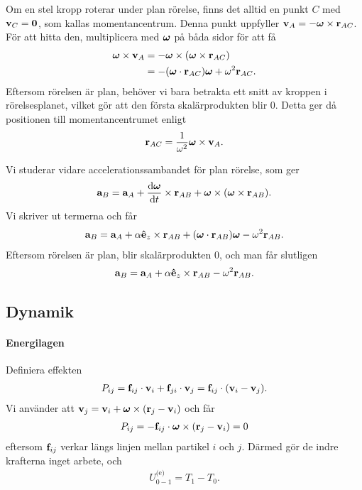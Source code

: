 Om en stel kropp roterar under plan rörelse, finns det alltid en punkt $C$ med $\vb{v}_{C} = \vb{0}$, som kallas momentancentrum. Denna punkt uppfyller $\vb{v}_{A} = -\vb*{\omega}\times\vb{r}_{AC}$. För att hitta den, multiplicera med $\vb*{\omega}$ på båda sidor för att få
\begin{align*}
	\vb*{\omega}\times\vb{v}_{A} &= -\vb*{\omega}\times(\vb*{\omega}\times\vb{r}_{AC}) \\
	                             &= -(\vb*{\omega}\cdot\vb{r}_{AC})\vb*{\omega} + \omega^2\vb{r}_{AC}.
\end{align*}
Eftersom rörelsen är plan, behöver vi bara betrakta ett snitt av kroppen i rörelsesplanet, vilket gör att den första skalärprodukten blir $0$. Detta ger då positionen till momentancentrumet enligt
\begin{align*}
	\vb{r}_{AC} = \frac{1}{\omega^2}\vb*{\omega}\times\vb{v}_{A}.
\end{align*}

Vi studerar vidare accelerationssambandet för plan rörelse, som ger
\begin{align*}
	\vb{a}_{B} = \vb{a}_{A} + \dv{\vb*{\omega}}{t}\times\vb{r}_{AB} + \vb*{\omega}\times(\vb*{\omega}\times\vb{r}_{AB}).
\end{align*}
Vi skriver ut termerna och får
\begin{align*}
	\vb{a}_{B} = \vb{a}_{A} + \alpha\vu{e}_{z}\times\vb{r}_{AB} + (\vb*{\omega}\cdot\vb{r}_{AB})\vb*{\omega} - \omega^2\vb{r}_{AB}.
\end{align*}
Eftersom rörelsen är plan, blir skalärprodukten $0$, och man får slutligen
\begin{align*}
	\vb{a}_{B} = \vb{a}_{A} + \alpha\vu{e}_{z}\times\vb{r}_{AB} - \omega^2\vb{r}_{AB}.
\end{align*}

\subsection{Dynamik}

\paragraph{Energilagen}
Definiera effekten
\begin{align*}
	P_{ij} = \vb{f}_{ij}\cdot\vb{v}_{i} + \vb{f}_{ji}\cdot\vb{v}_{j} = \vb{f}_{ij}\cdot(\vb{v}_{i} - \vb{v}_{j}).
\end{align*}
Vi använder att $\vb{v}_{j} = \vb{v}_{i} + \vb*{\omega}\times(\vb{r}_{j} - \vb{v}_{i})$ och får
\begin{align*}
	P_{ij} = -\vb{f}_{ij}\cdot\vb*{\omega}\times(\vb{r}_{j} - \vb{v}_{i}) = 0
\end{align*}
eftersom $\vb{f}_{ij}$ verkar längs linjen mellan partikel $i$ och $j$. Därmed gör de indre krafterna inget arbete, och
\begin{align*}
	U_{0 - 1}^{\text{(e)}} = T_{1} - T_{0}.
\end{align*}